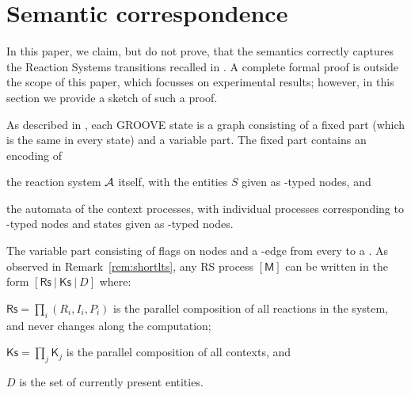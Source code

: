 
\section{Semantic correspondence}

In this paper, we claim, but do not prove, that the \GROOVE semantics correctly captures the Reaction Systems transitions recalled in . A complete formal proof is outside the scope of this paper, which focusses on experimental results; however, in this section we provide a sketch of such a proof.

As described in , each GROOVE state is a graph consisting of a fixed part (which is the same in every state) and a variable part. The fixed part contains an encoding of
\begin{enumerate*}[label=\emph{(\roman*)}]
\item the reaction system $\cal A$ itself, with the entities $S$ given as \Entity-typed nodes, and
\item the automata of the context processes, with individual processes corresponding to \Token-typed nodes and states given as \State-typed nodes.
\end{enumerate*} 
The variable part consisting of \present flags on \Entity nodes and a \current-edge from every \Token to a \State. 
As observed in Remark~\ref{rem:shortlts}, any RS process $[\mathsf{M}]$ can be written in the form $[\mathsf{Rs}~|~\mathsf{Ks}~|~D]$ where:
\begin{enumerate*}[label=\emph{(\roman*)}]
\item  $\mathsf{Rs}=\prod_i (R_i,I_i,P_i)$ is the parallel composition of all reactions in the system, and never changes along the computation;
\item $\mathsf{Ks}=\prod_j \mathsf{K}_j$ is the parallel composition of all contexts, and 
\item $D$ is the set of currently present entities. 
\end{enumerate*}


